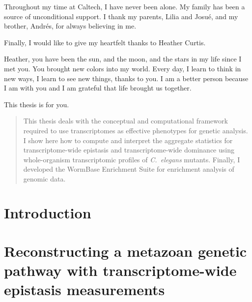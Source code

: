 \documentclass[12pt]{caltech_thesis}
\newcommand{\cel}{\emph{C.~elegans}}
\begin{document}
\begin{acknowledgements}
  Throughout my time at Caltech, I have never been alone. My family has been a
  source of unconditional support. I thank my parents, Lilia and Josué, and my
  brother, Andrés, for always believing in me.

  Finally, I would like to give my heartfelt thanks to Heather Curtis.

  Heather, you have been the sun, and the moon, and the stars in my life since I
  met you. You brought new colors into my world. Every day, I learn to think in
  new ways, I learn to see new things, thanks to you. I am a better person
  because I am with you and I am grateful that life brought us together.

  This thesis is for you.
\end{acknowledgements}

\begin{abstract}
  This thesis deals with the conceptual and computational framework required to
  use transcriptomes as effective phenotypes for genetic analysis. I show here
  how to compute and interpret the aggregate statistics for transcriptome-wide
  epistasis and transcriptome-wide dominance using whole-organism transcriptomic
  profiles of \cel{} mutants. Finally, I developed the WormBase Enrichment Suite
  for enrichment analysis of genomic data.
\end{abstract}

\begin{publishedcontent}[iknowwhattodo]

\nocite{Angeles-Albores2018b, Angeles-Albores2018, Angeles2018micro,
        Angeles-Albores2017, Angeles-Albores2016}
\end{publishedcontent}

\tableofcontents
\listoffigures
\listoftables

\mainmatter{}

\chapter{Introduction}
\begin{refsection}
  
  \printbibliography[heading=subbibliography]
\end{refsection}

\chapter{Reconstructing a metazoan genetic pathway with transcriptome-wide
         epistasis measurements}
\begin{refsection}
  
  \printbibliography[heading=subbibliography]
\end{refsection}
\end{document}

